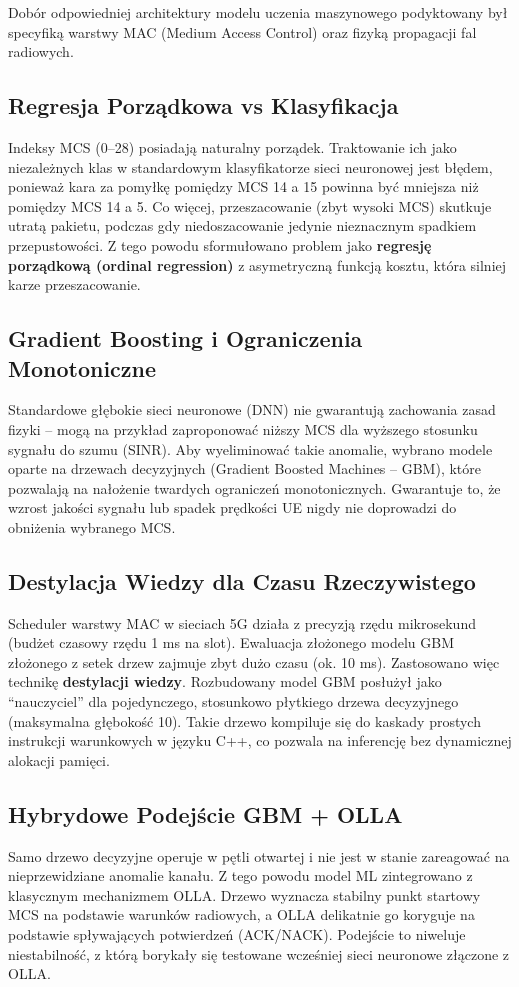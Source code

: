 \documentclass[11pt,a4paper]{article}
\begin{document}
Dobór odpowiedniej architektury modelu uczenia maszynowego podyktowany był specyfiką warstwy MAC (Medium Access Control) oraz fizyką propagacji fal radiowych. 

\subsection{Regresja Porządkowa vs Klasyfikacja}
Indeksy MCS (0--28) posiadają naturalny porządek. Traktowanie ich jako niezależnych klas w standardowym klasyfikatorze sieci neuronowej jest błędem, ponieważ kara za pomyłkę pomiędzy MCS 14 a 15 powinna być mniejsza niż pomiędzy MCS 14 a 5. Co więcej, przeszacowanie (zbyt wysoki MCS) skutkuje utratą pakietu, podczas gdy niedoszacowanie jedynie nieznacznym spadkiem przepustowości. Z tego powodu sformułowano problem jako \textbf{regresję porządkową (ordinal regression)} z asymetryczną funkcją kosztu, która silniej karze przeszacowanie.

\subsection{Gradient Boosting i Ograniczenia Monotoniczne}
Standardowe głębokie sieci neuronowe (DNN) nie gwarantują zachowania zasad fizyki -- mogą na przykład zaproponować niższy MCS dla wyższego stosunku sygnału do szumu (SINR). Aby wyeliminować takie anomalie, wybrano modele oparte na drzewach decyzyjnych (Gradient Boosted Machines -- GBM), które pozwalają na nałożenie twardych ograniczeń monotonicznych. Gwarantuje to, że wzrost jakości sygnału lub spadek prędkości UE nigdy nie doprowadzi do obniżenia wybranego MCS.

\subsection{Destylacja Wiedzy dla Czasu Rzeczywistego}
Scheduler warstwy MAC w sieciach 5G działa z precyzją rzędu mikrosekund (budżet czasowy rzędu 1 ms na slot). Ewaluacja złożonego modelu GBM złożonego z setek drzew zajmuje zbyt dużo czasu (ok. 10 ms). Zastosowano więc technikę \textbf{destylacji wiedzy}. Rozbudowany model GBM posłużył jako ``nauczyciel'' dla pojedynczego, stosunkowo płytkiego drzewa decyzyjnego (maksymalna głębokość 10). Takie drzewo kompiluje się do kaskady prostych instrukcji warunkowych w języku C++, co pozwala na inferencję bez dynamicznej alokacji pamięci.

\subsection{Hybrydowe Podejście GBM + OLLA}
Samo drzewo decyzyjne operuje w pętli otwartej i nie jest w stanie zareagować na nieprzewidziane anomalie kanału. Z tego powodu model ML zintegrowano z klasycznym mechanizmem OLLA. Drzewo wyznacza stabilny punkt startowy MCS na podstawie warunków radiowych, a OLLA delikatnie go koryguje na podstawie spływających potwierdzeń (ACK/NACK). Podejście to niweluje niestabilność, z którą borykały się testowane wcześniej sieci neuronowe złączone z OLLA.
\end{document}
